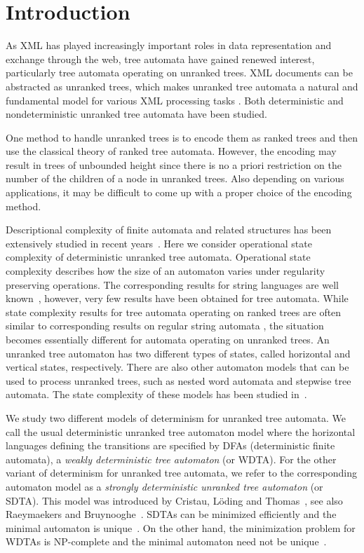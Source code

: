 \documentclass[copyright]{eptcs}
\begin{document}
\section{Introduction}\label{s:in}

As XML \cite{dtddef} has  played increasingly important roles in
data representation and exchange through the web,  tree automata
have gained renewed interest, particularly tree automata operating
on unranked trees. XML documents can be abstracted as unranked
trees, which makes unranked tree automata a natural and
fundamental model for various XML processing tasks
\cite{CDG,MaN,Sc}. Both deterministic and nondeterministic
unranked tree automata have been studied.

One method to handle unranked trees is to encode them as ranked
trees and then use the classical
theory of ranked tree automata. However, the
encoding may result in trees of unbounded height since there is
no a priori restriction on the number of the children of a node in
unranked trees. Also depending on various applications, it may
be difficult to come up with a proper
 choice of the encoding method.

Descriptional complexity of finite automata and related
structures has been extensively studied
in recent years~\cite{GH,HK2,HK,Yu,Yu2}.
Here we consider operational state complexity of deterministic unranked
tree automata. Operational state complexity describes how the size
of an automaton varies under regularity preserving operations.
The corresponding results for string languages are well
known~\cite{galina,Yu,YuZhSa94},
however, very few results have been obtained for tree automata.
While   state complexity results for  tree automata
operating on ranked trees
 are often similar to corresponding
results on  regular string automata \cite{Yu}, the situation becomes
essentially different for automata operating on unranked trees.
An unranked tree automaton has two different types of states,
called horizontal and vertical states, respectively.
There are also other automaton models that
can be used to process  unranked trees, such
as nested word automata and stepwise tree automata. The state
complexity of these models has been studied
in~\cite{HS,mn,nestps}.

We study two different models of determinism for unranked
tree automata.
We call the usual deterministic unranked tree automaton \cite{CDG}
model where
the horizontal languages defining the transitions are specified by
DFAs (deterministic finite automata),
 a {\em weakly deterministic tree automaton} (or WDTA). For the
other variant of determinism for unranked tree automata,  we
refer to the corresponding automaton model as a
 {\em strongly deterministic unranked tree automaton} (or SDTA).
This model was introduced by Cristau, L\"oding and
Thomas~\cite{CLT}, see also
Raeymaekers and Bruynooghe~\cite{RB}.
SDTAs can be minimized efficiently and the
minimal automaton is unique~\cite{CLT}. On the other hand, the
minimization problem for WDTAs is NP-complete and the minimal
automaton need not be unique~\cite{mn}.
\end{document}
